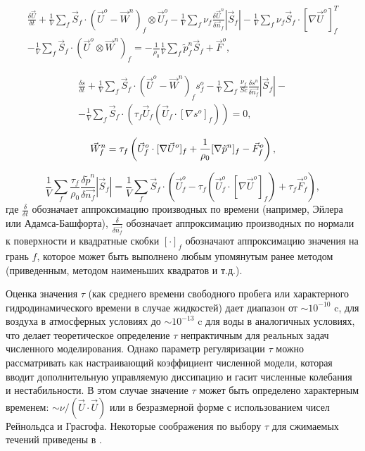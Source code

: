 \begin{multline}\label{eq:qhd_approx_momentum}
    \frac{\delta \vec{U}}{\delta t} + \frac{1}{V} \sum_f \vec{S}_f \cdot \left( \vec{U}^o - \vec{W}^n \right)_f \otimes \vec{U}^o_f  - \frac{1}{V} \sum_f \nu_f \frac{\delta\vec{U}^n}{\delta \vec{n}_f} |\vec{S}_f| - \frac{1}{V} \sum_f \nu_f \vec{S}_f \cdot [\nabla \vec U^o]_f^T \\
    - \frac{1}{V} \sum_f \vec{S}_f \cdot \left( \vec{U}^o \otimes \vec{W}^n \right)_f = - \frac{1}{\rho_0} \frac{1}{V} \sum_f \tilde p^n_f \vec S_f + \vec{F}^o,
\end{multline}

\begin{multline}\label{eq:qhd_approx_stransport}
    \frac{\delta s}{\delta t} + \frac{1}{V}\sum_f \vec{S}_f \cdot \left (\vec{U}^o - \vec{W}^n \right)_f s^o_f - \frac{1}{V} \sum_f \frac{\nu_f}{Sc} \frac{\delta s^n}{\delta \vec{n_f}} |\vec{S}_f| - \\
    - \frac{1}{V} \sum_f \vec{S}_f \cdot \left( \tau_f \vec{U}_f  (\vec{U}_f \cdot [\nabla s^o]_f) \right) = 0,
\end{multline}

\begin{equation}\label{eq:qhd_approx_W}
    \vec W^n_f = \tau_f \left ( \vec U^o_f \cdot [\nabla \vec U^o]_f + \frac{1}{\rho_0} [\nabla \Tilde{p}^n]_f - \vec F^o_f  \right ),
\end{equation}

\begin{equation}\label{eq:qhd_approx_pressure}
        \frac{1}{V} \sum_f \frac{\tau_f}{\rho_0} \frac{\delta \tilde p^n}{\delta \vec{n_f}} |\vec{S}_f|  = \frac{1}{V} \sum_f \vec{S}_f \cdot \left( \vec{U}^o_f - \tau_f (\vec{U}^o_f \cdot [\nabla \vec{U}^o]_f ) + \tau_f \vec{F}^o_f \right),
\end{equation}
где $\frac{\delta}{\delta t}$ обозначает аппроксимацию производных по времени (например, Эйлера или Адамса-Башфорта), $\frac{\delta}{\delta \vec{n_f}} $ обозначает аппроксимацию производных по нормали к поверхности и квадратные скобки $[\cdot]_f$ обозначают аппроксимацию значения на грань $f$, которое может быть выполнено любым упомянутым ранее методом (приведенным, методом наименьших квадратов и т.д.).

Оценка значения $\tau$ (как среднего времени свободного пробега или характерного гидродинамического времени в случае жидкостей) дает диапазон от $\sim 10^{-10}$ c, для воздуха в атмосферных условиях до $\sim 10^{-13}$ c для воды в аналогичных условиях, что делает теоретическое определение $\tau$ непрактичным для реальных задач численного моделирования. Однако параметр регуляризации $\tau $ можно рассматривать как настраивающий коэффициент численной модели, которая вводит дополнительную управляемую диссипацию и гасит численные колебания и нестабильности. В этом случае значение $\tau $ может быть определено характерным временем: $\sim \nu / (\vec U \cdot \vec U) $ или в безразмерной форме с использованием чисел Рейнольдса и Грасгофа. Некоторые соображения по выбору $\tau$ для сжимаемых течений приведены в \cite{Kraposhin2018}.

